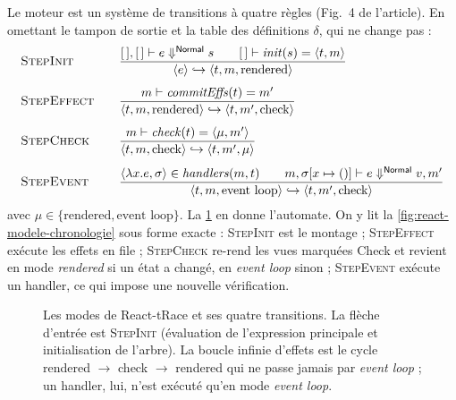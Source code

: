 Le moteur est un système de transitions à quatre règles (Fig.~4 de
l'article). En omettant le tampon de sortie et la table des définitions
$\delta$, qui ne change pas :
\[
\begin{array}{l@{\qquad}l}
\textsc{StepInit} &
  \dfrac{[\,],[\,] \vdash e \Downarrow^{\mathsf{Normal}} s
         \qquad [\,] \vdash \mathit{init}(s) = \langle t, m\rangle}
        {\langle e\rangle \hookrightarrow \langle t, m, \text{rendered}\rangle}\\[14pt]
\textsc{StepEffect} &
  \dfrac{m \vdash \mathit{commitEffs}(t) = m'}
        {\langle t, m, \text{rendered}\rangle \hookrightarrow \langle t, m', \text{check}\rangle}\\[14pt]
\textsc{StepCheck} &
  \dfrac{m \vdash \mathit{check}(t) = \langle \mu, m'\rangle}
        {\langle t, m, \text{check}\rangle \hookrightarrow \langle t, m', \mu\rangle}\\[14pt]
\textsc{StepEvent} &
  \dfrac{\langle \lambda x.e, \sigma\rangle \in \mathit{handlers}(m, t)
         \qquad m, \sigma[x \mapsto ()] \vdash e \Downarrow^{\mathsf{Normal}} v, m'}
        {\langle t, m, \text{event loop}\rangle \hookrightarrow \langle t, m', \text{check}\rangle}
\end{array}
\]
avec $\mu \in \{\text{rendered}, \text{event loop}\}$. La
\cref{fig:react-modele-trace-modes} en donne l'automate. On y lit la
\cref{fig:react-modele-chronologie} sous forme exacte : \textsc{StepInit} est le
montage ; \textsc{StepEffect} exécute les effets en file ; \textsc{StepCheck}
re-rend les vues marquées \textsf{Check} et revient en mode \emph{rendered} si
un état a changé, en \emph{event loop} sinon ; \textsc{StepEvent} exécute un
handler, ce qui impose une nouvelle vérification.

\ifhastikz
\begin{figure}[htbp]\centering
{}
\caption{Les modes de React-tRace et ses quatre transitions. La flèche
d'entrée est \textsc{StepInit} (évaluation de l'expression principale et
initialisation de l'arbre). La boucle infinie d'effets est le cycle
rendered $\to$ check $\to$ rendered qui ne passe jamais par \emph{event loop} ;
un handler, lui, n'est exécuté qu'en mode \emph{event loop}.}
\label{fig:react-modele-trace-modes}
\end{figure}
\fi

